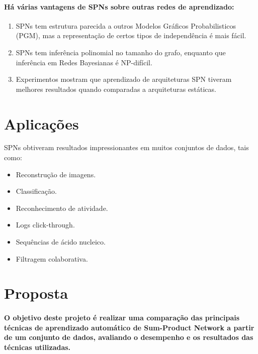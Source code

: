 \documentclass[a4paper,10pt]{article}
\theoremstyle{plain}
\begin{document}
\paragraph{
  Há várias vantagens de SPNs sobre outras redes de aprendizado:
}

\begin{enumerate} \itemsep0pt
  \item SPNs tem estrutura parecida a outros Modelos Gráficos Probabilisticos (PGM), mas a 
    representação de certos tipos de independência é mais fácil.
  \item SPNs tem inferência polinomial no tamanho do grafo, enquanto que inferência em Redes Bayesianas
    é NP-difícil.
  \item Experimentos mostram que aprendizado de arquiteturas SPN tiveram melhores resultados quando
    comparadas a arquiteturas estáticas.\cite{clustering}
\end{enumerate}

\section{Aplicações}

SPNs obtiveram resultados impressionantes em muitos conjuntos de dados\cite{website:spn-uwashington}, tais como:

\begin{itemize} \itemsep0pt
  \item Reconstrução de imagens.
  \item Classificação.
  \item Reconhecimento de atividade.
  \item Logs click-through.
  \item Sequências de ácido nucleico.
  \item Filtragem colaborativa.
\end{itemize}

\section{Proposta}

\paragraph{
  O objetivo deste projeto é realizar uma comparação das principais técnicas de aprendizado 
automático de Sum-Product Network a partir de um conjunto de dados, avaliando o desempenho 
e os resultados das técnicas utilizadas.
}
\end{document}
